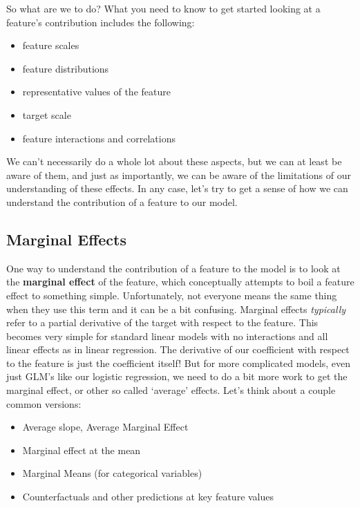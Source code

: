\documentclass[
  letterpaper,
]{krantz}
\providecommand{\tightlist}{%
  \setlength{\itemsep}{0pt}\setlength{\parskip}{0pt}}\usepackage{longtable,booktabs,array}
\begin{document}
So what are we to do? What you need to know to get started looking at a
feature's contribution includes the following:

\begin{itemize}
\tightlist
\item
  feature scales
\item
  feature distributions
\item
  representative values of the feature
\item
  target scale
\item
  feature interactions and correlations
\end{itemize}

We can't necessarily do a whole lot about these aspects, but we can at
least be aware of them, and just as importantly, we can be aware of the
limitations of our understanding of these effects. In any case, let's
try to get a sense of how we can understand the contribution of a
feature to our model.

\subsection{Marginal Effects}\label{marginal-effects}

One way to understand the contribution of a feature to the model is to
look at the \textbf{marginal effect} of the feature, which conceptually
attempts to boil a feature effect to something simple. Unfortunately,
not everyone means the same thing when they use this term and it can be
a bit confusing. Marginal effects \emph{typically} refer to a partial
derivative of the target with respect to the feature. This becomes very
simple for standard linear models with no interactions and all linear
effects as in linear regression. The derivative of our coefficient with
respect to the feature is just the coefficient itself! But for more
complicated models, even just GLM's like our logistic regression, we
need to do a bit more work to get the marginal effect, or other so
called `average' effects. Let's think about a couple common versions:

\begin{itemize}
\tightlist
\item
  Average slope, Average Marginal Effect
\item
  Marginal effect at the mean
\item
  Marginal Means (for categorical variables)
\item
  Counterfactuals and other predictions at key feature values
\end{itemize}
\end{document}
